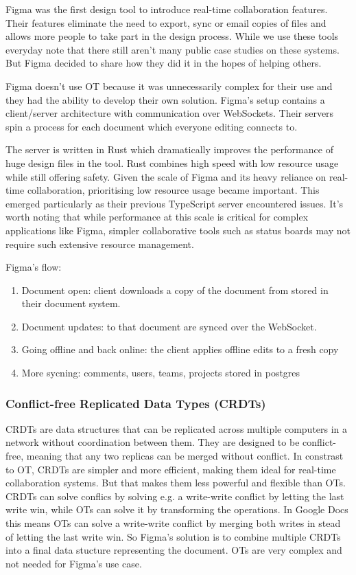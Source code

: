 Figma was the first design tool to introduce real-time collaboration features. Their features eliminate the need to export, sync or email copies of files and allows more people to take part in the design process. While we use these tools everyday note that there still aren't many public case studies on these systems. But Figma decided to share how they did it in the hopes of helping others.

Figma doesn't use OT because it was unnecessarily complex for their use and they had the ability to develop their own solution. Figma's setup contains a client/server architecture with communication over WebSockets. Their servers spin a process for each document which everyone editing connects to. \cite{figma-rtc}

The server is written in Rust which dramatically improves the performance of huge design files in the tool. Rust combines high speed with low resource usage while still offering safety. Given the scale of Figma and its heavy reliance on real-time collaboration, prioritising low resource usage became important. This emerged particularly as their previous TypeScript server encountered issues. It's worth noting that while performance at this scale is critical for complex applications like Figma, simpler collaborative tools such as status boards may not require such extensive resource management. \cite{figma-rust}

Figma's flow:

\begin{enumerate}
  \item Document open: client downloads a copy of the document from stored in their document system.
  \item Document updates: to that document are synced over the WebSocket.
  \item Going offline and back online: the client applies offline edits to a fresh copy
  \item More sycning: comments, users, teams, projects stored in postgres
\end{enumerate}

\subsubsection*{Conflict-free Replicated Data Types (CRDTs)}

CRDTs are data structures that can be replicated across multiple computers in a network without coordination between them. They are designed to be conflict-free, meaning that any two replicas can be merged without conflict. In constrast to OT, CRDTs are simpler and more efficient, making them ideal for real-time collaboration systems. But that makes them less powerful and flexible than OTs. CRDTs can solve conflics by solving e.g. a write-write conflict by letting the last write win, while OTs can solve it by transforming the operations. In Google Docs this means OTs can solve a write-write conflict by merging both writes in stead of letting the last write win. So Figma's solution is to combine multiple CRDTs into a final data stucture representing the document. OTs are very complex and not needed for Figma's use case.


